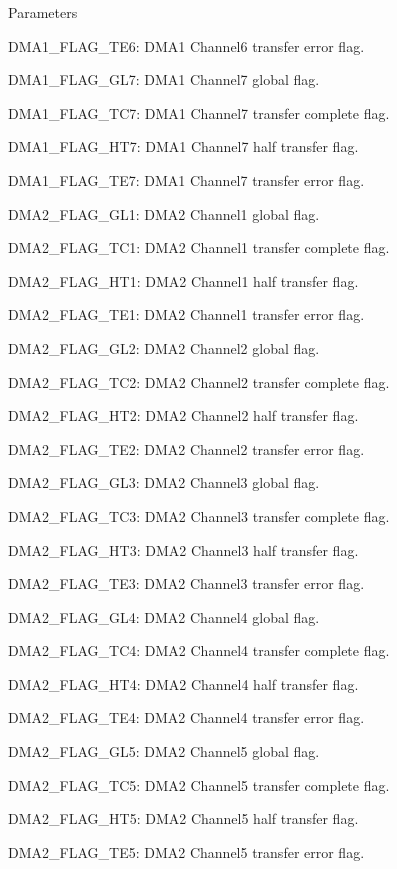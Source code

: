 \begin{DoxyParams}{Parameters}
\begin{DoxyItemize}
D\+M\+A1\+\_\+\+F\+L\+A\+G\+\_\+\+T\+E6\+: D\+M\+A1 Channel6 transfer error flag. \item D\+M\+A1\+\_\+\+F\+L\+A\+G\+\_\+\+G\+L7\+: D\+M\+A1 Channel7 global flag. \item D\+M\+A1\+\_\+\+F\+L\+A\+G\+\_\+\+T\+C7\+: D\+M\+A1 Channel7 transfer complete flag. \item D\+M\+A1\+\_\+\+F\+L\+A\+G\+\_\+\+H\+T7\+: D\+M\+A1 Channel7 half transfer flag. \item D\+M\+A1\+\_\+\+F\+L\+A\+G\+\_\+\+T\+E7\+: D\+M\+A1 Channel7 transfer error flag. \item D\+M\+A2\+\_\+\+F\+L\+A\+G\+\_\+\+G\+L1\+: D\+M\+A2 Channel1 global flag. \item D\+M\+A2\+\_\+\+F\+L\+A\+G\+\_\+\+T\+C1\+: D\+M\+A2 Channel1 transfer complete flag. \item D\+M\+A2\+\_\+\+F\+L\+A\+G\+\_\+\+H\+T1\+: D\+M\+A2 Channel1 half transfer flag. \item D\+M\+A2\+\_\+\+F\+L\+A\+G\+\_\+\+T\+E1\+: D\+M\+A2 Channel1 transfer error flag. \item D\+M\+A2\+\_\+\+F\+L\+A\+G\+\_\+\+G\+L2\+: D\+M\+A2 Channel2 global flag. \item D\+M\+A2\+\_\+\+F\+L\+A\+G\+\_\+\+T\+C2\+: D\+M\+A2 Channel2 transfer complete flag. \item D\+M\+A2\+\_\+\+F\+L\+A\+G\+\_\+\+H\+T2\+: D\+M\+A2 Channel2 half transfer flag. \item D\+M\+A2\+\_\+\+F\+L\+A\+G\+\_\+\+T\+E2\+: D\+M\+A2 Channel2 transfer error flag. \item D\+M\+A2\+\_\+\+F\+L\+A\+G\+\_\+\+G\+L3\+: D\+M\+A2 Channel3 global flag. \item D\+M\+A2\+\_\+\+F\+L\+A\+G\+\_\+\+T\+C3\+: D\+M\+A2 Channel3 transfer complete flag. \item D\+M\+A2\+\_\+\+F\+L\+A\+G\+\_\+\+H\+T3\+: D\+M\+A2 Channel3 half transfer flag. \item D\+M\+A2\+\_\+\+F\+L\+A\+G\+\_\+\+T\+E3\+: D\+M\+A2 Channel3 transfer error flag. \item D\+M\+A2\+\_\+\+F\+L\+A\+G\+\_\+\+G\+L4\+: D\+M\+A2 Channel4 global flag. \item D\+M\+A2\+\_\+\+F\+L\+A\+G\+\_\+\+T\+C4\+: D\+M\+A2 Channel4 transfer complete flag. \item D\+M\+A2\+\_\+\+F\+L\+A\+G\+\_\+\+H\+T4\+: D\+M\+A2 Channel4 half transfer flag. \item D\+M\+A2\+\_\+\+F\+L\+A\+G\+\_\+\+T\+E4\+: D\+M\+A2 Channel4 transfer error flag. \item D\+M\+A2\+\_\+\+F\+L\+A\+G\+\_\+\+G\+L5\+: D\+M\+A2 Channel5 global flag. \item D\+M\+A2\+\_\+\+F\+L\+A\+G\+\_\+\+T\+C5\+: D\+M\+A2 Channel5 transfer complete flag. \item D\+M\+A2\+\_\+\+F\+L\+A\+G\+\_\+\+H\+T5\+: D\+M\+A2 Channel5 half transfer flag. \item D\+M\+A2\+\_\+\+F\+L\+A\+G\+\_\+\+T\+E5\+: D\+M\+A2 Channel5 transfer error flag. \end{DoxyItemize}
\\
\hline
\end{DoxyParams}

